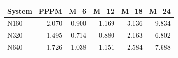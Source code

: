 \begin{tabular}{lrrrrr}
\toprule
System & PPPM & M=6 & M=12 & M=18 & M=24 \\
\midrule
N160 & 2.070 & 0.900 & 1.169 & 3.136 & 9.834 \\
N320 & 1.495 & 0.714 & 0.880 & 2.163 & 6.802 \\
N640 & 1.726 & 1.038 & 1.151 & 2.584 & 7.688 \\
\bottomrule
\end{tabular}
